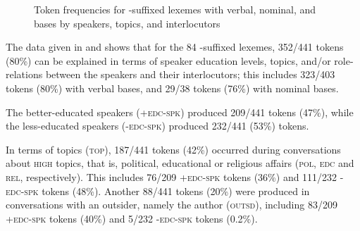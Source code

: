 \begin{figure}
\centering
\caption{Token frequencies for -suffixed lexemes with verbal, nominal, and  bases by speakers, topics, and interlocutors\label{Figure_3.2}}
\end{figure}

The data given in  and  shows that for the 84 -suffixed lexemes, 352/441 tokens (80\%) can be explained in terms of speaker education levels, topics, and/or role-relations between the speakers and their interlocutors; this includes 323/403 tokens (80\%) with verbal bases, and 29/38 tokens (76\%) with nominal bases.


The better-educated speakers (\textsc{+edc-spk}) produced 209/441 tokens (47\%), while the less-educated speakers (\textsc{-edc-spk}) produced 232/441 (53\%) tokens.



In terms of topics (\textsc{top}), 187/441 tokens (42\%) occurred during conversations about \textsc{high} topics, that is, political, educational or religious affairs (\textsc{pol}, \textsc{edc} and \textsc{rel}, respectively). This includes 76/209 \textsc{+edc-spk} tokens (36\%) and 111/232 \textsc{-edc-spk} tokens (48\%). 
Another 88/441 tokens (20\%) were produced in conversations with an outsider, namely the author (\textsc{outsd}), including 83/209 \textsc{+edc-spk} tokens (40\%) and 5/232 \textsc{-edc-spk} tokens (0.2\%).



